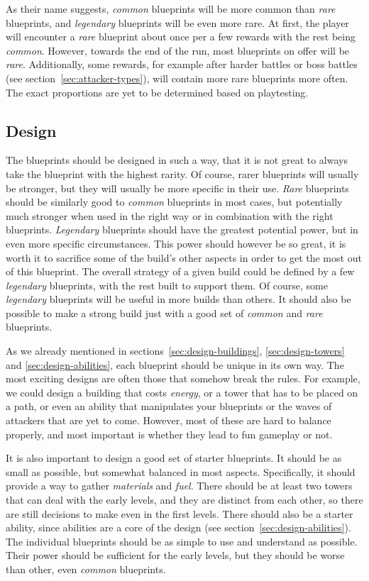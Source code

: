 As their name suggests, \emph{common} blueprints will be more common than \emph{rare} blueprints, and \emph{legendary} blueprints will be even more rare.
At first, the player will encounter a \emph{rare} blueprint about once per a few rewards with the rest being \emph{common}.
However, towards the end of the run, most blueprints on offer will be \emph{rare}.
Additionally, some rewards, for example after harder battles or boss battles (see section~\ref{sec:attacker-types}), will contain more rare blueprints more often.
The exact proportions are yet to be determined based on playtesting.

\subsection{Design}

The blueprints should be designed in such a way, that it is not great to always take the blueprint with the highest rarity.
Of course, rarer blueprints will usually be stronger, but they will usually be more specific in their use.
\emph{Rare} blueprints should be similarly good to \emph{common} blueprints in most cases, but potentially much stronger when used in the right way or in combination with the right blueprints.
\emph{Legendary} blueprints should have the greatest potential power, but in even more specific circumstances.
This power should however be so great, it is worth it to sacrifice some of the build's other aspects in order to get the most out of this blueprint.
The overall strategy of a given build could be defined by a few \emph{legendary} blueprints, with the rest built to support them.
Of course, some \emph{legendary} blueprints will be useful in more builds than others.
It should also be possible to make a strong build just with a good set of \emph{common} and \emph{rare} blueprints.

As we already mentioned in sections~\ref{sec:design-buildings}, \ref{sec:design-towers} and \ref{sec:design-abilities}, each blueprint should be unique in its own way.
The most exciting designs are often those that somehow break the rules.
For example, we could design a building that costs \emph{energy}, or a tower that has to be placed on a path, or even an ability that manipulates your blueprints or the waves of attackers that are yet to come.
However, most of these are hard to balance properly, and most important is whether they lead to fun gameplay or not.

It is also important to design a good set of starter blueprints.
It should be as small as possible, but somewhat balanced in most aspects.
Specifically, it should provide a way to gather \emph{materials} and \emph{fuel}.
There should be at least two towers that can deal with the early levels, and they are distinct from each other, so there are still decisions to make even in the first levels.
There should also be a starter ability, since abilities are a core of the design (see section~\ref{sec:design-abilities}).
The individual blueprints should be as simple to use and understand as possible.
Their power should be sufficient for the early levels, but they should be worse than other, even \emph{common} blueprints.


